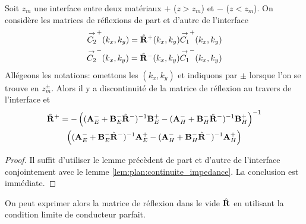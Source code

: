         \begin{lemme}
            \label{lem:plan:discontinuite_reflexion}
            Soit \(z_m\) une interface entre deux matériaux \(+\) (\(z>z_m\)) et \(-\) (\(z<z_m\)). On considère les matrices de réflexions de part et d'autre de l'interface
            \begin{align*}
                {\overset{\rightarrow}{C_2}}^+(k_x,k_y)  = \hat{\mathbf{R}}^+(k_x,k_y) {\overset{\rightarrow}{C_1}}^+(k_x,k_y)
                \\
                {\overset{\rightarrow}{C_2}}^-(k_x,k_y)  = \hat{\mathbf{R}}^-(k_x,k_y) {\overset{\rightarrow}{C_1}}^-(k_x,k_y)
            \end{align*}
            Allégeons les notations: omettons les \((k_x,k_y)\) et indiquons par \(\pm\) lorsque l'on se trouve en \(z_m^\pm\).
            Alors il y a discontinuité de la matrice de réflexion au travers de l'interface et
            \begin{multline*}
            \hat{\mathbf{R}}^+ = - \left((\mathbf{A}_E^- + \mathbf{B}_E^-\hat{\mathbf{R}}^-)^{-1}\mathbf{B}_E^+ - (\mathbf{A}_H^- + \mathbf{B}_H^-\hat{\mathbf{R}}^-)^{-1}\mathbf{B}_H^+\right)^{-1}
            \\
            \left((\mathbf{A}_E^- + \mathbf{B}_E^-\hat{\mathbf{R}}^-)^{-1}\mathbf{A}_E^+ - (\mathbf{A}_H^- + \mathbf{B}_H^-\hat{\mathbf{R}}^-)^{-1}\mathbf{A}_H^+\right)
            \end{multline*}
        \end{lemme}
        \begin{proof}
            Il suffit d'utiliser le lemme précèdent de part et d'autre de l'interface conjointement avec le lemme \ref{lem:plan:continuite_impedance}. La conclusion est immédiate.
        \end{proof}

        On peut exprimer alors la matrice de réflexion dans le vide \(\hat{\mathbf{R}}\) en utilisant la condition limite de conducteur parfait.


